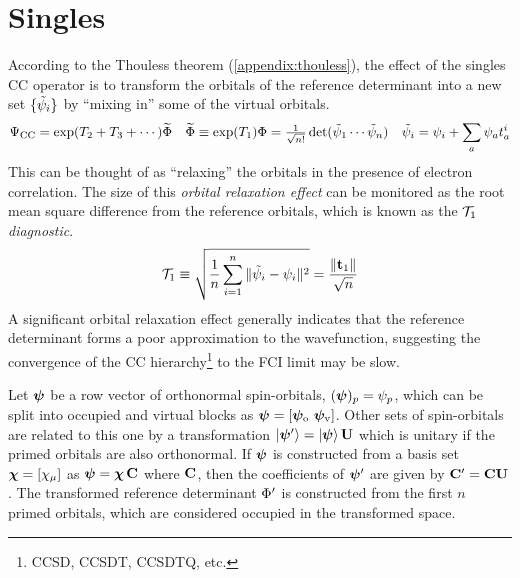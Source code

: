 \documentclass[11pt]{article}
\numberwithin{equation}{section}
\begin{document}
\setlength{\abovedisplayskip}{5pt}
\setlength{\belowdisplayskip}{5pt}


\setcounter{section}{7}
\section{Singles}

\begin{rmk}
According to the Thouless theorem (\cref{appendix:thouless}), the effect of the singles CC operator is to transform the orbitals of the reference determinant into a new set $\{\tilde{\psi }_i\}$ by ``mixing in'' some of the virtual orbitals.
\begin{align}
  \Psi _{\mathrm{CC}}
=
  \mathrm{exp}(T_2 + T_3 + \cdots)
  \widetilde{\Phi }
&&
  \widetilde{\Phi }
\equiv
  \mathrm{exp}(T_1)
  \Phi 
=
  \tfrac{1}{\sqrt{n!}}\,
  \mathrm{det}(\tilde{\psi }_1\cdots \tilde{\psi }_n)
&&
  \tilde{\psi }_i
=
  \psi _i
+
  \sum_a
  \psi _a
  t_a^i
\end{align}
This can be thought of as ``relaxing'' the orbitals in the presence of electron correlation.
The size of this \textit{orbital relaxation effect} can be monitored as the root mean square difference from the reference orbitals, which is known as the \textit{$\mathcal{T}_1$ diagnostic}.
\begin{align}
  \mathcal{T}_1
\equiv
  \sqrt{
  \frac {1}{n}
  \sum_{i=1}^n
  \|\tilde{\psi }_i - \psi _i\|^2
  }
=
  \frac {\|\mathbf{t}_1\|}{\sqrt{n}}
\end{align}
A significant orbital relaxation effect generally indicates that the reference determinant forms a poor approximation to the wavefunction, suggesting the convergence of the CC hierarchy\footnote{CCSD, CCSDT, CCSDTQ, etc.} to the FCI limit may be slow.
\end{rmk}



\begin{ntt}
\label{ntt:orbital-transformation}
Let $\bm{\y}$ be a row vector of orthonormal spin-orbitals, $(\bm{\y})_p=\y_p$, which can be split into occupied and virtual blocks as $\bm{\y}=[\bm{\y}_\mr{o}\ \bm{\y}_\mr{v}]$.
Other sets of spin-orbitals are related to this one by a transformation
$
  \kt{\bm{\y}'}
=
  \kt{\bm{\y}}\,
  \bo{U}
$
which is unitary if the primed orbitals are also orthonormal.
If $\bm{\y}$ is constructed from a basis set $\bm{\x}=[\x_\mu]$ as $\bm{\y}=\bm{\x}\,\bo{C}$ where $\mathbf{C}$, then the coefficients of $\bm{\y}'$ are given by $\mathbf{C}'=\mathbf{C}\mathbf{U}$.
The transformed reference determinant $\Phi '$ is constructed from the first $n$ primed orbitals, which are considered occupied in the transformed space.
\end{ntt}
\end{document}
